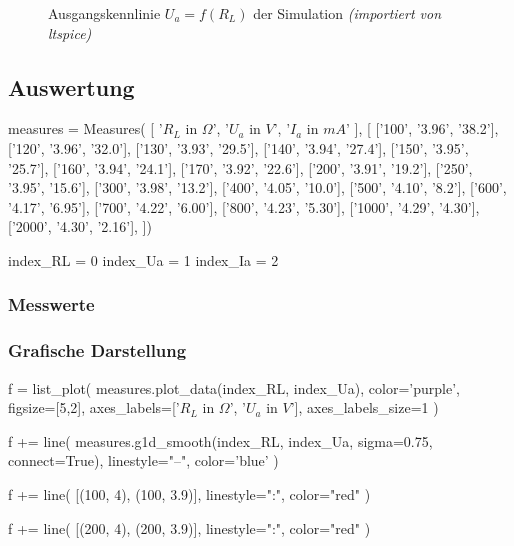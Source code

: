 \begin{figure}[H]
    \centering
    \caption{Ausgangskennlinie \textbf{$U_{a} = f(R_L)$} der Simulation \textit{(importiert von ltspice)}}
\end{figure}

\subsection{Auswertung}

\begin{sagesilent}
    measures = Measures(
        [
            '$R_L$ in $\Omega$',
            '$U_a$ in $V$', 
            '$I_a$ in $mA$'
        ], [
            ['100', '3.96', '38.2'],
            ['120', '3.96', '32.0'],
            ['130', '3.93', '29.5'],
            ['140', '3.94', '27.4'],
            ['150', '3.95', '25.7'],
            ['160', '3.94', '24.1'],
            ['170', '3.92', '22.6'],
            ['200', '3.91', '19.2'],
            ['250', '3.95', '15.6'],
            ['300', '3.98', '13.2'],
            ['400', '4.05', '10.0'],
            ['500', '4.10', '8.2'],
            ['600', '4.17', '6.95'],
            ['700', '4.22', '6.00'],
            ['800', '4.23', '5.30'],
            ['1000', '4.29', '4.30'],
            ['2000', '4.30', '2.16'],
    ])

    index_RL = 0
    index_Ua = 1
    index_Ia = 2
\end{sagesilent}

\subsubsection{Messwerte}

\begin{center}
    \renewcommand{\arraystretch}{1.2}
\end{center}

\subsubsection{Grafische Darstellung}

\begin{sagesilent}
    f = list_plot(
        measures.plot_data(index_RL, index_Ua),
        color='purple',
        figsize=[5,2],
        axes_labels=['$R_L$ in $\Omega$', '$U_a$ in $V$'],
        axes_labels_size=1
    )

    f += line(
        measures.g1d_smooth(index_RL, index_Ua, sigma=0.75, connect=True),
        linestyle="--",
        color='blue'
    )

    f += line(
        [(100, 4), (100, 3.9)],
        linestyle=":",
        color="red"
    )

    f += line(
        [(200, 4), (200, 3.9)],
        linestyle=":",
        color="red"
    )
\end{sagesilent}

